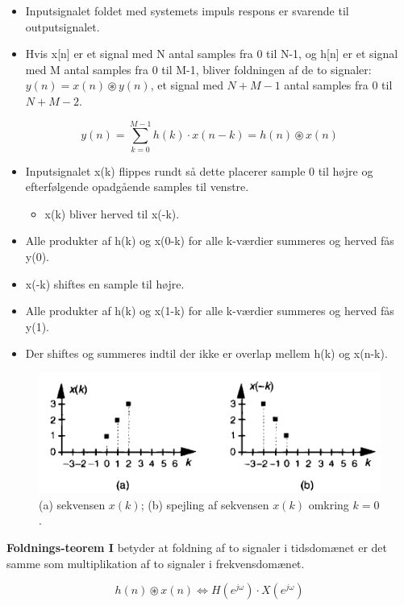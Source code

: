 \documentclass[danish]{article}
\begin{document}
\begin{itemize}
	\item Inputsignalet foldet med systemets impuls respons er svarende til outputsignalet.
	\item Hvis x[n] er et signal med N antal samples fra 0
	til N-1, og h[n] er et signal med M antal samples fra 0 til M-1, bliver foldningen af de to signaler:  $y(n) = x(n) \circledast y(n)$, et signal med $N+M-1$ antal samples fra 0 til $N+M-2$.
\end{itemize}

\begin{equation}
y(n) = \sum_{k=0}^{M-1} h(k) \cdot x(n-k) = h(n) \circledast x(n)
\end{equation}

\begin{itemize}
	\item Inputsignalet x(k) flippes rundt så dette placerer
	sample 0 til højre og efterfølgende opadgående samples til venstre.
	\begin{itemize}
		\item x(k) bliver herved til x(-k).
	\end{itemize}
	\item Alle produkter af h(k) og x(0-k) for alle k-værdier summeres og herved fås y(0).
	\item x(-k) shiftes en sample til højre.
	\item  Alle produkter af h(k) og x(1-k) for alle k-værdier summeres og herved fås y(1).
	\item Der shiftes og summeres indtil der ikke er overlap mellem h(k) og x(n-k).
\end{itemize}

\begin{figure}[H]
	\centering
	\includegraphics[width=0.6\linewidth]{graphics/convolution}
	\caption{(a) sekvensen $x(k)$; (b) spejling af sekvensen $x(k)$ omkring $k = 0$.}
	\label{fig:convolution}
\end{figure}

\textbf{Foldnings‐teorem I} betyder at foldning af to signaler i tidsdomænet er det samme som multiplikation af to signaler i frekvensdomænet.

\begin{equation}
h(n) \circledast x(n) \Leftrightarrow H(e^{j\omega}) \cdot X(e^{j\omega})
\end{equation}
\end{document}
